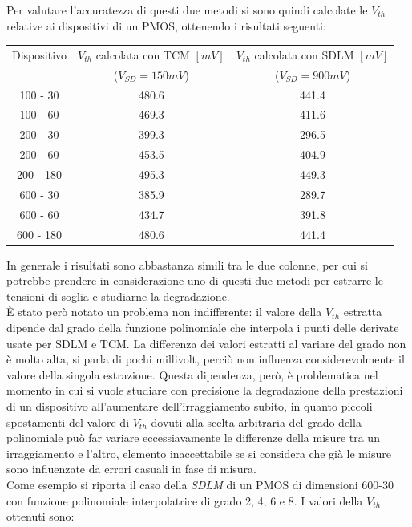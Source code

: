 \documentclass[12pt, letterpaper]{book}
\begin{document}
Per valutare l'accuratezza di questi due metodi si sono quindi calcolate le $V_{th}$ relative ai dispositivi di un PMOS, ottenendo i risultati seguenti:

\begin{center}
\begin{tabular}{| c | c | c |}
\hline
Dispositivo &  $V_{th}$  calcolata con TCM $[mV]$  & $V_{th}$  calcolata con SDLM $[mV]$ \\
 & ($V_{SD} = 150 mV$) & ($V_{SD} = 900 mV$) \\
\hline
100 - 30  & 480.6 & 441.4 \\
100 - 60  & 469.3 & 411.6 \\
200 - 30  & 399.3 & 296.5 \\
200 - 60  & 453.5 & 404.9 \\
200 - 180 & 495.3 & 449.3 \\
600 - 30 & 385.9 & 289.7 \\
600 - 60 & 434.7 & 391.8 \\
600 - 180 & 480.6 & 441.4 \\
\hline

\end{tabular}
\end{center}

In generale i risultati sono abbastanza simili tra le due colonne, per cui si potrebbe prendere in considerazione uno di questi due metodi  per estrarre le tensioni di soglia e studiarne la degradazione.\\
È stato però notato un problema non indifferente: il valore della $V_{th}$ estratta dipende dal grado della funzione polinomiale che interpola i punti delle derivate usate per SDLM e TCM. La differenza dei valori estratti al variare del grado non è molto alta, si parla di pochi millivolt, perciò non influenza considerevolmente il valore della singola estrazione. Questa dipendenza, però, è problematica nel momento in cui si vuole studiare con precisione la degradazione della prestazioni di un dispositivo all'aumentare dell'irraggiamento subito, in quanto piccoli spostamenti del valore di $V_{th}$ dovuti alla scelta arbitraria del grado della polinomiale può far variare eccessiavamente le differenze della misure tra un irraggiamento e l'altro, elemento inaccettabile se si considera che già le misure sono influenzate da errori casuali in fase di misura.\\
Come esempio si riporta il caso della \emph{SDLM} di un PMOS di dimensioni 600-30 con funzione polinomiale interpolatrice di grado 2, 4, 6 e 8. I valori della $V_{th}$ ottenuti sono: 
\end{document}
